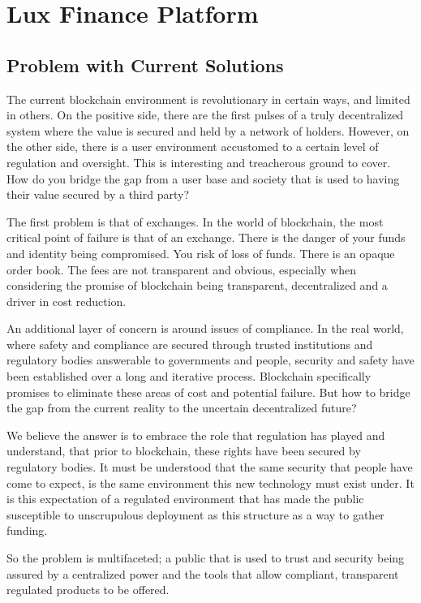 \documentclass[11pt]{article}
\begin{document}
\section{Lux Finance Platform}

\subsection{Problem with Current Solutions}

The current blockchain environment is revolutionary in certain ways, and limited in others. On the positive side, there are the first pulses of a truly decentralized system where the value is secured and held by a network of holders. However, on the other side, there is a user environment accustomed to a certain level of regulation and oversight. This is interesting and treacherous ground to cover.  How do you bridge the gap from a user base and society that is used to having their value secured by a third party?


The first problem is that of exchanges. In the world of blockchain, the most critical point of failure is that of an exchange. There is the danger of your funds and identity being compromised. You risk of loss of funds. There is an opaque order book. The fees are not transparent and obvious, especially when considering the promise of blockchain being transparent, decentralized and a driver in cost reduction.


An additional layer of concern is around issues of compliance. In the real world, where safety and compliance are secured through trusted institutions and regulatory bodies answerable to governments and people, security and safety have been established over a long and iterative process. Blockchain specifically promises to eliminate these areas of cost and potential failure. But how to bridge the gap from the current reality to the uncertain decentralized future?


We believe the answer is to embrace the role that regulation has played and understand, that prior to blockchain, these rights have been secured by regulatory bodies. It must be understood that the same security that people have come to expect, is the same environment this new technology must exist under. It is this expectation of a regulated environment that has made the public susceptible to unscrupulous deployment as this structure as a way to gather funding.


So the problem is multifaceted; a public that is used to trust and security being assured by a centralized power and the tools that allow compliant, transparent regulated products to be offered.
\end{document}
